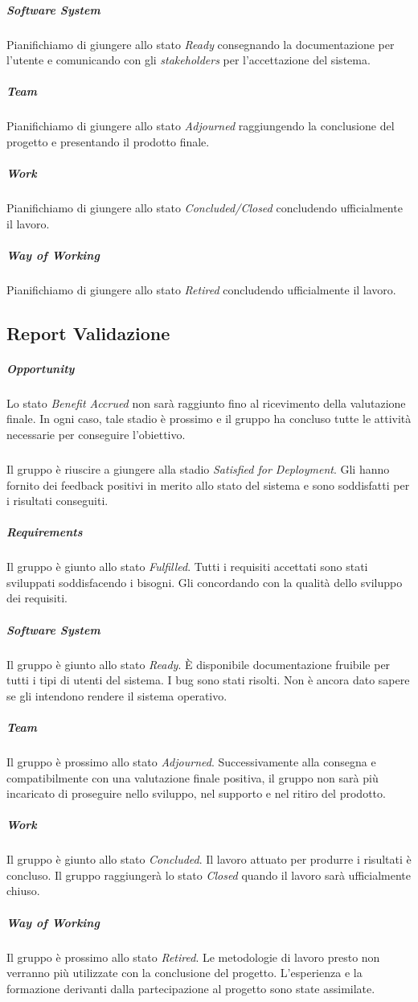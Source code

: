 	\subparagraph{Software System}
	Pianifichiamo di giungere allo stato \emph{Ready} consegnando la documentazione per l'utente e comunicando con gli \emph{stakeholders} per l'accettazione del sistema.
	
	\subparagraph{Team}
	Pianifichiamo di giungere allo stato \emph{Adjourned} raggiungendo la conclusione del progetto e presentando il prodotto finale.
	
	\subparagraph{Work}
	Pianifichiamo di giungere allo stato \emph{Concluded/Closed} concludendo ufficialmente il lavoro.
	
	\subparagraph{Way of Working}
	Pianifichiamo di giungere allo stato \emph{Retired} concludendo ufficialmente il lavoro.

\subsection{Report Validazione}
	
	\subparagraph{Opportunity}
	Lo stato \emph{Benefit Accrued} non sarà raggiunto fino al ricevimento della valutazione finale. In ogni caso, tale stadio è prossimo e il gruppo ha concluso tutte le attività necessarie per conseguire l'obiettivo.

	\subparagraph{}
	Il gruppo è riuscire a giungere alla stadio \emph{Satisfied for Deployment}. Gli  hanno fornito dei feedback positivi in merito allo stato del sistema e sono soddisfatti per i risultati conseguiti.

	\subparagraph{Requirements}
	Il gruppo è giunto allo stato \emph{Fulfilled}. Tutti i requisiti accettati sono stati sviluppati soddisfacendo i bisogni. Gli  concordando con la qualità dello sviluppo dei requisiti.

	\subparagraph{Software System}
	Il gruppo è giunto allo stato \emph{Ready}. \`E disponibile documentazione fruibile per tutti i tipi di utenti del sistema. I bug sono stati risolti. Non è ancora dato sapere se gli  intendono rendere il sistema operativo.
 
	\subparagraph{Team}
	Il gruppo è prossimo allo stato \emph{Adjourned}. Successivamente alla consegna e compatibilmente con una valutazione finale positiva, il gruppo non sarà più incaricato di proseguire nello sviluppo, nel supporto e nel ritiro del prodotto.

	\subparagraph{Work}
	Il gruppo è giunto allo stato \emph{Concluded}. Il lavoro attuato per produrre i risultati è concluso. Il gruppo raggiungerà lo stato \emph{Closed} quando il lavoro sarà ufficialmente chiuso.

	\subparagraph{Way of Working}
	Il gruppo è prossimo allo stato \emph{Retired}. Le metodologie di lavoro presto non verranno più utilizzate con la conclusione del progetto. L'esperienza e la formazione derivanti dalla partecipazione al progetto sono state assimilate.

	\newpage